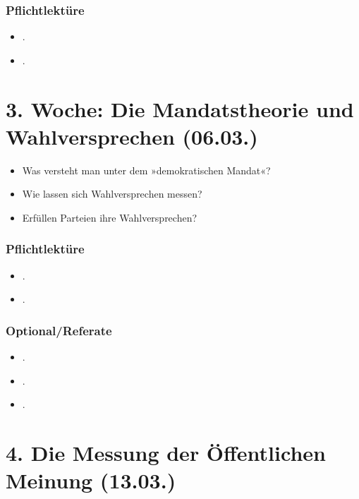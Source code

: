 \documentclass[abstract=on,parskip=full,headings=standardclasses,fontsize=11pt,paper=a4]{scrartcl}
\begin{document}
\subsubsection*{Pflichtlektüre}
\begin{itemize}
\item {}.
\item {}.
\end{itemize}



\section{3. Woche: Die Mandatstheorie und Wahlversprechen (06.03.)}

\begin{itemize}
\renewcommand\labelitemi{--}
\item Was versteht man unter dem »demokratischen Mandat«?
\item Wie lassen sich Wahlversprechen messen?
\item Erfüllen Parteien ihre Wahlversprechen?
\end{itemize}

\subsubsection*{Pflichtlektüre}
\begin{itemize}
\item {}.
\item {}.
\end{itemize}

\subsubsection*{Optional/Referate}
\begin{itemize}
\item {}.
\item {}.
\item {}.
\end{itemize}


\section{4. Die Messung der Öffentlichen Meinung (13.03.)}
\end{document}
